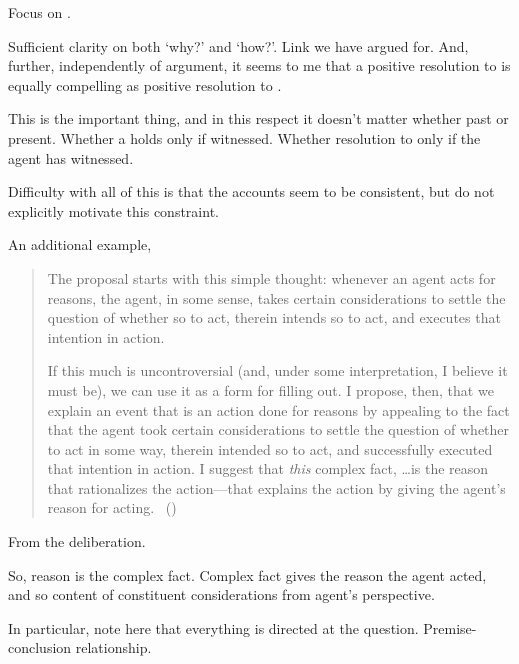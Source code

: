 \begin{note}
  Focus on \issueConstraint{}.
  \vspace{-\baselineskip}
  \begin{quote}
    \rIssueConstraint*
  \end{quote}
  Sufficient clarity on both `why?' and `how?'.
  Link we have argued for.
  And, further, independently of argument, it seems to me that a positive resolution to \issueConstraint{} is equally compelling as positive resolution to \issueInclusion{}.
\end{note}

\begin{note}
  This is the important thing, and in this respect it doesn't matter whether past or present.
  Whether a \support{} holds only if witnessed.
  Whether resolution to \qWhy{} only if the agent has witnessed.
\end{note}

\begin{note}
  Difficulty with all of this is that the accounts seem to be consistent, but do not explicitly motivate this constraint.
\end{note}

\begin{note}
  An additional example, \citeauthor{Hieronymi:2011aa}
  \begin{quote}
    The proposal starts with this simple thought: whenever an agent acts for reasons, the agent, in some sense, takes certain considerations to settle the question of whether so to act, therein intends so to act, and executes that intention in action.

    If this much is uncontroversial (and, under some interpretation, I believe it must be), we can use it as a form for filling out.
    I propose, then, that we explain an event that is an action done for reasons by appealing to the fact that the agent took certain considerations to settle the question of whether to act in some way, therein intended so to act, and successfully executed that intention in action.
    I suggest that \emph{this} complex fact, \dots is the reason that rationalizes the action---that explains the action by giving the agent’s reason for acting.%
    \mbox{ }\hfill\mbox{(\citeyear[431]{Hieronymi:2011aa})}
  \end{quote}

  From the deliberation.

  So, reason is the complex fact.
  Complex fact gives the reason the agent acted, and so content of constituent considerations from agent's perspective.

  In particular, note here that everything is directed at the question.
  Premise-conclusion relationship.
\end{note}

